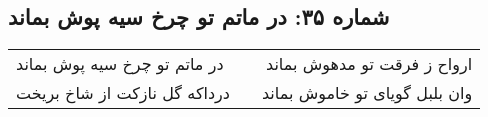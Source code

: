 \begin{center}
\section*{شماره ۳۵: در ماتم تو چرخ سیه پوش بماند}
\label{sec:035}
\begin{longtable}{l p{0.5cm} r}
در ماتم تو چرخ سیه پوش بماند
&&
ارواح ز فرقت تو مدهوش بماند
\\
درداکه گل نازکت از شاخ بریخت
&&
وان بلبل گویای تو خاموش بماند
\\
\end{longtable}
\end{center}
